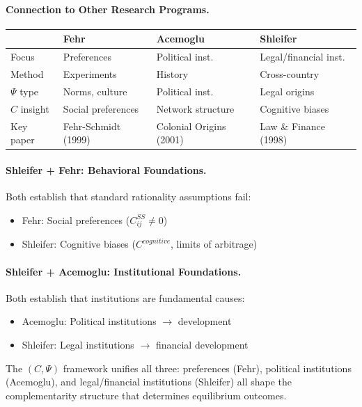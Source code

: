 \documentclass[12pt,a4paper]{article}
\begin{document}
\paragraph{Connection to Other Research Programs.}

\begin{center}
\renewcommand{\arraystretch}{1.2}
\begin{tabular}{llll}
\hline
& \textbf{Fehr} & \textbf{Acemoglu} & \textbf{Shleifer} \\
\hline
Focus & Preferences & Political inst. & Legal/financial inst. \\
Method & Experiments & History & Cross-country \\
$\Psi$ type & Norms, culture & Political inst. & Legal origins \\
$C$ insight & Social preferences & Network structure & Cognitive biases \\
Key paper & Fehr-Schmidt (1999) & Colonial Origins (2001) & Law \& Finance (1998) \\
\hline
\end{tabular}
\end{center}

\paragraph{Shleifer + Fehr: Behavioral Foundations.}
Both establish that standard rationality assumptions fail:
\begin{itemize}
  \item Fehr: Social preferences ($C^{SS}_{ij} \neq 0$)
  \item Shleifer: Cognitive biases ($C^{cognitive}$, limits of arbitrage)
\end{itemize}

\paragraph{Shleifer + Acemoglu: Institutional Foundations.}
Both establish that institutions are fundamental causes:
\begin{itemize}
  \item Acemoglu: Political institutions $\to$ development
  \item Shleifer: Legal institutions $\to$ financial development
\end{itemize}

The $(C, \Psi)$ framework unifies all three: preferences (Fehr), political
institutions (Acemoglu), and legal/financial institutions (Shleifer) all
shape the complementarity structure that determines equilibrium outcomes.
\end{document}
